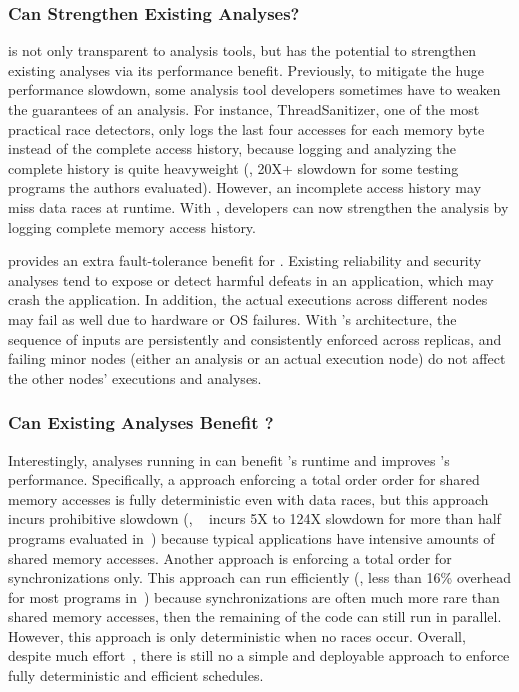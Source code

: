 \subsubsection{Can \xxx Strengthen Existing Analyses?} 
\label{sec:strengthen-analysis}

\xxx is not only transparent to analysis tools, but has the potential to 
strengthen existing analyses via its performance benefit. Previously, to 
mitigate the huge performance slowdown, some analysis tool developers sometimes 
have to weaken the guarantees of an analysis. For instance, 
ThreadSanitizer\cite{tsan}, one of the most practical race detectors, only 
logs the last four accesses for each memory byte instead of the complete access 
history, because logging and analyzing the complete history is quite 
heavyweight (\eg, 20X+ slowdown for some testing programs the authors 
evaluated). However, an incomplete access history may miss data races at 
runtime. With \xxx, developers can now strengthen the analysis by logging 
complete memory access history.

\smr provides an extra fault-tolerance benefit for \xxx. Existing 
reliability and security analyses tend to expose or detect harmful defeats in 
an application, which may crash the application. In addition, the actual 
executions across different nodes may fail as well due to hardware or OS 
failures. With \xxx's \smr architecture, the sequence of inputs are 
persistently and consistently enforced across replicas, and failing minor 
nodes (either an analysis or an actual execution node) do not affect the other 
nodes' executions and analyses.

\subsubsection{Can Existing Analyses Benefit \xxx?} 
\label{sec:strengthen-crane}

Interestingly, analyses running in \xxx can benefit \xxx's \dmt runtime and 
improves \xxx's performance. Specifically, a \dmt approach enforcing a total 
order order for shared memory accesses is fully deterministic even with data 
races, but this approach incurs prohibitive slowdown (\eg, 
\dthreads~\cite{dthreads:sosp11} incurs 5X to 124X slowdown for more than half 
programs evaluated in~\cite{parrot:sosp13}) because typical applications have 
intensive amounts of shared memory accesses. Another \dmt approach is enforcing 
a total order for synchronizations only. This approach can run efficiently (\eg, 
less than 16\% overhead for most programs in~\cite{kendo:asplos09, 
cui:tern:osdi10, parrot:sosp13}) because synchronizations are often much more 
rare than shared memory accesses, then the remaining of the code can still run 
in parallel. However, this \dmt approach is only deterministic when no races 
occur. Overall, despite much effort~\cite{dthreads:sosp11, peregrine:sosp11, 
determinator:osdi10}, there is still no a simple and deployable approach to 
enforce fully deterministic and efficient \dmt schedules.


